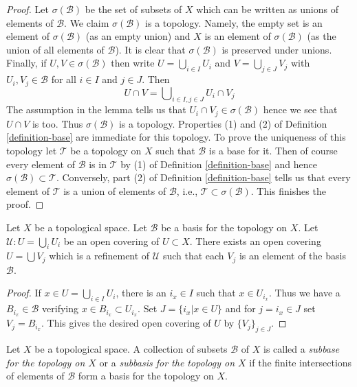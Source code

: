 \begin{proof}
Let $\sigma(\mathcal B)$ be the set of subsets of $X$ which can be written
as unions of elements of $\mathcal B$. We claim $\sigma(\mathcal{B})$
is a topology. Namely, the empty set is an element of $\sigma(\mathcal{B})$
(as an empty union) and $X$ is an element of $\sigma(\mathcal{B})$ (as the
union of all elements of $\mathcal{B}$). It is clear that $\sigma(\mathcal{B})$
is preserved under unions. Finally, if $U, V \in \sigma(\mathcal{B})$
then write $U = \bigcup_{i \in I} U_i$ and $V = \bigcup_{j \in J} V_j$
with $U_i, V_j \in \mathcal{B}$ for all $i \in I$ and $j \in J$.
Then
$$
U \cap V = \bigcup\nolimits_{i \in I, j \in J}
U_i \cap V_j
$$
The assumption in the lemma tells us that $U_i \cap V_j \in \sigma(\mathcal{B})$
hence we see that $U \cap V$ is too. Thus $\sigma(\mathcal{B})$ is a topology.
Properties (1) and (2) of Definition \ref{definition-base} are
immediate for this topology. To prove the uniqueness of this topology
let $\mathcal T$ be a topology on $X$ such that $\mathcal B$ is a base for it.
Then of course every element of $\mathcal{B}$ is in $\mathcal{T}$ by
(1) of Definition \ref{definition-base} and
hence $\sigma(\mathcal{B}) \subset \mathcal{T}$. Conversely, part
(2) of Definition \ref{definition-base} tells us that every element
of $\mathcal{T}$ is a union of elements of $\mathcal{B}$, i.e.,
$\mathcal{T} \subset \sigma(\mathcal{B})$. This finishes the proof.
\end{proof}

\begin{lemma}
\label{lemma-refine-covering-basis}
Let $X$ be a topological space.
Let $\mathcal{B}$ be a basis for the topology on $X$.
Let $\mathcal{U} : U = \bigcup_i U_i$ be an open covering of
$U \subset X$. There exists an open covering $U = \bigcup V_j$
which is a refinement of $\mathcal{U}$ such that each
$V_j$ is an element of the basis $\mathcal{B}$.
\end{lemma}

\begin{proof}
If $ x \in U = \bigcup_{i\in I} U_i $, there is an $ i_x \in I $ such that
$ x \in U_{i_x} $. Thus we have a $ B_{i_x} \in \mathcal{B}$
verifying $ x \in B_{i_x} \subset U_{i_x}$. Set
$J = \{i_x | x \in U\}$ and for $j = i_x \in J$ set $V_j = B_{i_x}$.
This gives the desired open covering of $U$ by $\{V_j\}_{j \in J}$.
\end{proof}

\begin{definition}
\label{definition-subbase}
Let $X$ be a topological space. A collection of subsets $\mathcal{B}$ of $X$
is called a {\it subbase for the topology on $X$} or a {\it subbasis for the
topology on $X$} if the finite intersections of
elements of $\mathcal{B}$ form a basis for the topology on $X$.
\end{definition}

